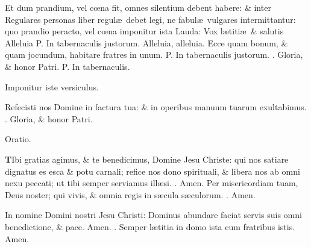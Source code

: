 \documentclass[letter,11pt]{book}
\makeatletter
\DeclareRobustCommand{\Vbar}{\vers@resp{-0.1em}{V}}
\DeclareRobustCommand{\Rbar}{\vers@resp{0pt}{R}}
\newcommand{\vers@resp@sym}{\raisebox{0.2ex}{\rotatebox[origin=c]{-20}{$\m@th\rceil$}}}
\newcommand{\vers@resp}[2]{%
  {\ooalign{\hidewidth\kern#1\vers@resp@sym\hidewidth\cr#2\cr}}%
}%
\def\P{\color{Red} P. \color{black}}
\def\V{\color{Red} \Vbar . \color{black}}
\def\R{\color{Red} \Rbar . \color{black}}
\makeatother
\begin{document}
\begin{multicols*}{2}
\par \color{Red} Et dum prandium, vel c\oe na fit, omnes silentium debent habere: \& inter Regulares personas liber regul\ae \ debet legi, ne fabul\ae \ vulgares intermittantur: quo prandio peracto, vel c\oe na imponitur ista Lauda: \color{black}
\vspace{-1em}
\newline Vox l\ae titi\ae \ \& salutis Alleluia \P In tabernaculis justorum. Alleluia, alleluia. Ecce quam bonum, \& quam jocundum, habitare fratres in unum. \P In tabernaculis justorum. \V Gloria, \& honor Patri. \P In tabernaculis.
\vspace{-.5em} \begin{center} \color{Red} Imponitur iste versiculus. \end{center} \vspace{-.5em}
\par \noindent Refecisti nos Domine in factura tua: \& in operibus manuum tuarum exultabimus. \V Gloria, \& honor Patri.
\vspace{-.5em} \begin{center} \color{Red} Oratio. \end{center} \vspace{-.5em}
\lettrine[lines=2]{\bfseries \color{Red} T}{}Ibi gratias agimus, \& te benedicimus, Domine Jesu Christe: qui nos satiare dignatus es esca \& potu carnali; refice nos dono spirituali, \& libera nos ab omni nexu peccati; ut tibi semper serviamus ill\ae si. \R Amen. Per misericordiam tuam, Deus noster; qui vivis, \& omnia regis in s\ae cula s\ae culorum. \R Amen.
\par In nomine Domini nostri Jesu Christi: Dominus abundare faciat servis suis omni benedictione, \& pace. Amen. \V Semper l\ae titia in domo ista cum fratribus istis. Amen.

\end{multicols*}
\end{document}
